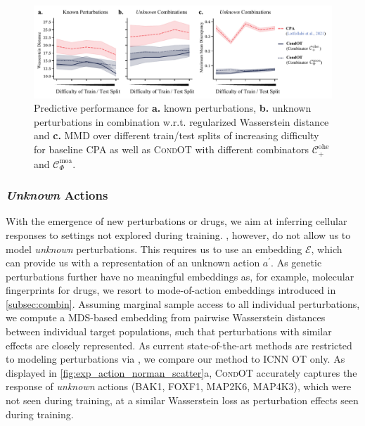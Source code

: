 \begin{figure}[t]
    \includegraphics[width=1.1\textwidth]{figures/fig_action_comb_comparison_metrics.pdf}
    \caption{Predictive performance for \textbf{a.} known perturbations, \textbf{b.} unknown perturbations in combination w.r.t. regularized Wasserstein distance and \textbf{c.} \acrshort{MMD} over different train/test splits of increasing difficulty for baseline \textsc{CPA} as well as \textsc{CondOT} with different combinators $\mathcal{C}^\text{ohe}_+$ and $\mathcal{C}^\text{moa}_\Phi$.}
    \label{fig:exp_action_norman_line}
\end{figure}


\subsubsection{\textit{Unknown} Actions}
\label{sec:eval_action_unknown}

 With the emergence of new perturbations or drugs, we aim at inferring cellular responses to settings not explored during training.
, however, do not allow us to model \emph{unknown} perturbations. 
This requires us to use an embedding $\mathcal{E}$, which can provide us with a representation of an unknown action $a^\prime$.
As genetic perturbations further have no meaningful embeddings as, for example, molecular fingerprints for drugs, we resort to mode-of-action embeddings introduced in \cref{subsec:combin}. Assuming marginal sample access to all individual perturbations, we compute a \acrshort{MDS}-based embedding from pairwise Wasserstein distances between individual target populations, such that perturbations with similar effects are closely represented. 
As current state-of-the-art methods are restricted to modeling perturbations via , we compare our method to \textsc{ICNN OT} only. As displayed in \cref{fig:exp_action_norman_scatter}a, \textsc{CondOT} accurately captures the response of \emph{unknown} actions (BAK1, FOXF1, MAP2K6, MAP4K3), which were not seen during training, at a similar Wasserstein loss as perturbation effects seen during training.
 
